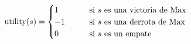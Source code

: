 \documentclass[preview]{standalone}
\begin{document}
\begin{align*}
\text{utility($s$)} =  \begin{cases}
                                 1 \qquad &\text{si $s$ es una victoria de Max} \cr
                                 -1 \qquad &\text{si $s$ es una derrota de Max} \cr
                                 0 \qquad &\text{si $s$ es un empate} \cr 
                                 \end{cases}
\end{align*}
\end{document}
